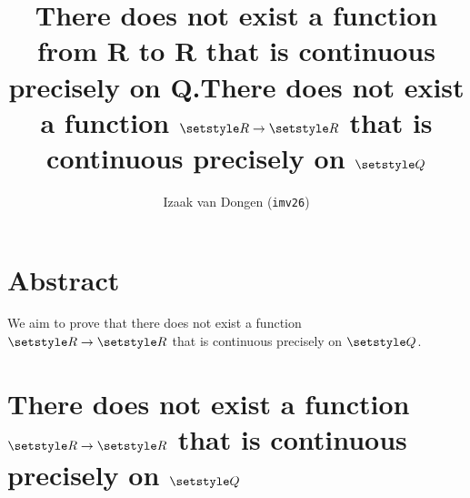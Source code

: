 \documentclass[fleqn,a4paper,11pt]{article}
\title{There does not exist a function from R to R that is continuous
       precisely on Q.}
\author{\texorpdfstring{Izaak van Dongen (\texttt{imv26})}
                       {Izaak van Dongen (imv26)}}
\begin{document}
\title{\texorpdfstring{There does not exist a function \(\R \to \R\) that is
                       continuous precisely on \(\Q\)}
                      {There does not exist a function from R to R that is
                       continuous precisely on Q}}
 \maketitle\thispagestyle{empty} %

 \section*{Abstract}

 We aim to prove that there does not exist a function \(\R \to \R\) that is
 continuous precisely on \(\Q\).

 \section*{\texorpdfstring{There does not exist a function
                           \boldmath\(\R \to \R\) that is continuous precisely
                           on \boldmath\(\Q\)}
                          {There does not exist a function from R to R that is
                           continuous precisely on Q}}
\end{document}
